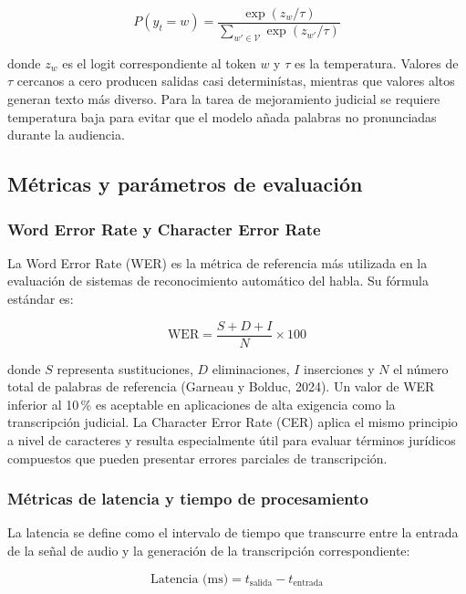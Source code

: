 \documentclass[12pt,a4paper,oneside]{article}
\begin{document}
\begin{equation}
P(y_t = w) = \frac{\exp(z_w / \tau)}{\sum_{w' \in \mathcal{V}} \exp(z_{w'} / \tau)}
\end{equation}

donde $z_w$ es el logit correspondiente al token $w$ y $\tau$ es la temperatura. Valores de $\tau$ cercanos a cero producen salidas casi determin\'istas, mientras que valores altos generan texto m\'as diverso. Para la tarea de mejoramiento judicial se requiere temperatura baja para evitar que el modelo a\~nada palabras no pronunciadas durante la audiencia.

\subsection{M\'etricas y par\'ametros de evaluaci\'on}

\subsubsection{Word Error Rate y Character Error Rate}

La Word Error Rate (WER) es la m\'etrica de referencia m\'as utilizada en la evaluaci\'on de sistemas de reconocimiento autom\'atico del habla. Su f\'ormula est\'andar es:

\begin{equation}
\text{WER} = \frac{S + D + I}{N} \times 100
\end{equation}

donde $S$ representa sustituciones, $D$ eliminaciones, $I$ inserciones y $N$ el n\'umero total de palabras de referencia (Garneau y Bolduc, 2024). Un valor de WER inferior al 10\,\% es aceptable en aplicaciones de alta exigencia como la transcripci\'on judicial. La Character Error Rate (CER) aplica el mismo principio a nivel de caracteres y resulta especialmente \'util para evaluar t\'erminos jur\'idicos compuestos que pueden presentar errores parciales de transcripci\'on.

\subsubsection{M\'etricas de latencia y tiempo de procesamiento}

La latencia se define como el intervalo de tiempo que transcurre entre la entrada de la se\~nal de audio y la generaci\'on de la transcripci\'on correspondiente:

\begin{equation}
\text{Latencia (ms)} = t_{\text{salida}} - t_{\text{entrada}}
\end{equation}
\end{document}
